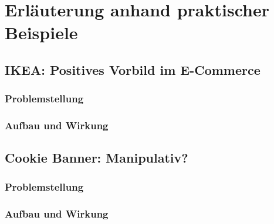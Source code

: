 \chapter{Erläuterung anhand praktischer Beispiele}

\section{IKEA: Positives Vorbild im E-Commerce}

\subsection{Problemstellung}
\subsection{Aufbau und Wirkung}

\section{Cookie Banner: Manipulativ?}

\subsection{Problemstellung}
\subsection{Aufbau und Wirkung}